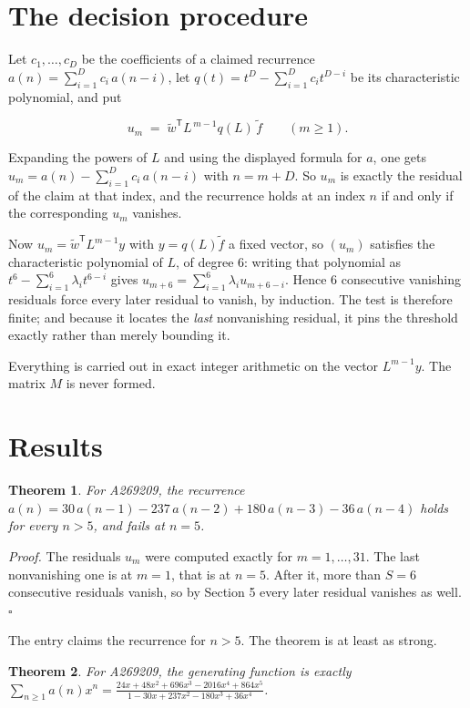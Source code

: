 \documentclass[11pt]{article}
\newtheorem{theorem}{Theorem}
\theoremstyle{definition}
\begin{document}
\section{The decision procedure}

Let $c_1,\dots,c_D$ be the coefficients of a claimed recurrence $a(n) = \sum_{i=1}^{D} c_i\,a(n-i)$, let $q(t) = t^{D} - \sum_{i=1}^{D} c_i t^{D-i}$ be its characteristic polynomial, and put

\[u_m \;=\; \tilde w^{\mathsf T} L^{\,m-1} q(L)\,\tilde f \qquad (m \ge 1).\]

Expanding the powers of $L$ and using the displayed formula for $a$, one gets $u_m = a(n) - \sum_{i=1}^{D} c_i\,a(n-i)$ with $n = m + D$. So $u_m$ is exactly the residual of the claim at that index, and the recurrence holds at an index $n$ if and only if the corresponding $u_m$ vanishes.

Now $u_m = \tilde w^{\mathsf T} L^{m-1} y$ with $y = q(L)\tilde f$ a fixed vector, so $(u_m)$ satisfies the characteristic polynomial of $L$, of degree $6$: writing that polynomial as $t^{6} - \sum_{i=1}^{6} \lambda_i t^{6-i}$ gives $u_{m+6} = \sum_{i=1}^{6} \lambda_i u_{m+6-i}$. Hence $6$ consecutive vanishing residuals force every later residual to vanish, by induction. The test is therefore finite; and because it locates the {\itshape last} nonvanishing residual, it pins the threshold exactly rather than merely bounding it.

Everything is carried out in exact integer arithmetic on the vector $L^{m-1}y$. The matrix $M$ is never formed.

\section{Results}

\begin{theorem} For A269209, the recurrence $a(n) = 30\,a(n-1) - 237\,a(n-2) + 180\,a(n-3) - 36\,a(n-4)$ holds for every $n > 5$, and fails at $n = 5$.\end{theorem}

{\itshape Proof.} The residuals $u_m$ were computed exactly for $m = 1,\dots,31$. The last nonvanishing one is at $m = 1$, that is at $n = 5$. After it, more than $S = 6$ consecutive residuals vanish, so by Section 5 every later residual vanishes as well. $\square$

The entry claims the recurrence for $n > 5$. The theorem is at least as strong.

\begin{theorem} For A269209, the generating function is exactly $\sum_{n\ge 1} a(n)x^n = \frac{24x + 48x^{2} + 696x^{3} - 2016x^{4} + 864x^{5}}{1 - 30x + 237x^{2} - 180x^{3} + 36x^{4}}$.\end{theorem}
\end{document}
